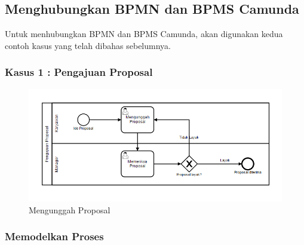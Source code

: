 \subsection{Menghubungkan BPMN dan BPMS Camunda}
\label{hubungkanbpmnbpms}
Untuk menhubungkan BPMN dan BPMS Camunda, akan digunakan kedua contoh kasus yang telah dibahas sebelumnya. 

\subsubsection{Kasus 1 : Pengajuan Proposal}
	
	\begin{figure}[H]
			\centering
			\includegraphics[scale=0.5]{Gambar/Bab-3/Kasus2-3}
			\caption{Mengunggah Proposal} 
			\label{fig:mengunggahproposalgroup}
		\end{figure}
		
		



\subsubsection{Memodelkan Proses}


